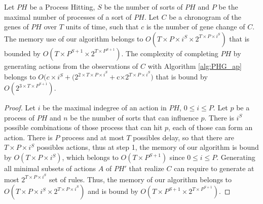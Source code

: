 \begin{theorem}[Complexity]
	\label{th:complexity}
	Let $PH$ be a Process Hitting, $S$ be the number of sorts of $PH$ and $P$ be the maximal number of processes of a sort of $PH$.
	Let $C$ be a chronogram of the genes of $PH$ over $T$ units of time, such that $c$ is the number of gene change of $C$.
	The memory use of our algorithm belongs to $O(T \times  P \times  i^S \times  2^{T\times  P \times  i^S})$ that is bounded by $O(T \times  P^{S+1} \times  2^{T\times  P^{S+1}})$.
	The complexity of completing $PH$ by generating actions from the observations of $C$ with Algorithm \ref{alg:PHG_ap} belongs to
	$O(c\times i^S + (2^{2\times T\times  P \times  i^S} + $c$ \times  2^{T\times  P \times  i^S})$ that is bound by $O(2^{3\times T\times P^{S+1}})$.
	\begin{proof}
		Let $i$ be the maximal indegree of an action in $PH$, $0 \leq i \leq P$.
		Let $p$ be a process of $PH$ and $n$ be the number of sorts that can influence $p$.
		There is $i^S$ possible combinations of those process that can hit $p$, each of those can form an action.
		There is $P$ process and at most $T$ possibles delay, so that there are $T\times  P \times  i^S$ possibles actions,
		thus at step 1, the memory of our algorithm is bound by $O(T \times  P \times  i^S)$,
		which belongs to $O(T\times P^{S+1})$ since $0 \leq i \leq P$.
		Generating all minimal subsets of actions $A$ of $PH'$ that realize $C$ can require to generate at most $2^{T\times  P \times  i^S}$ set of rules.
		Thus, the memory of our algorithm belongs to $O(T \times  P \times  i^S \times  2^{T\times  P \times  i^S})$ and is bound by $O(T \times  P^{S+1} \times  2^{T\times  P^{S+1}})$.
		

\end{proof}
\end{theorem}
